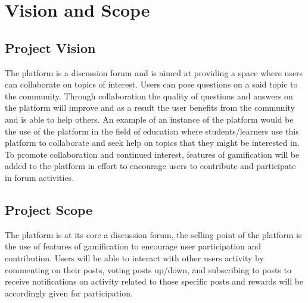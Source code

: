 \documentclass[12pt]{article}
\begin{document}
\newpage
\tableofcontents

\newpage
\section{Vision and Scope}    

\subsection{Project Vision} 

\par{The platform is a discussion forum and is aimed at providing a space where users can collaborate on topics of interest. Users can pose questions on a said topic to the community. Through collaboration the quality of questions and answers on the platform will improve and as a result the user benefits from the community and is able to help others. An example of an instance of the platform would be the use of the platform in the field of education where students/learners use this platform to collaborate and seek help on topics that they might be interested in. To promote collaboration and continued interest, features of gamification will be added to the platform in effort to encourage users to contribute and participate in forum activities.}

\subsection{Project Scope}
\par{The platform is at its core a discussion forum, the selling point of the platform is the use of features of gamification to encourage user participation and contribution. Users will be able to interact with other users activity by commenting on their posts, voting posts up/down, and subscribing to posts to receive notifications on activity related to those specific posts and rewards will be accordingly given for participation.}
\end{document}
